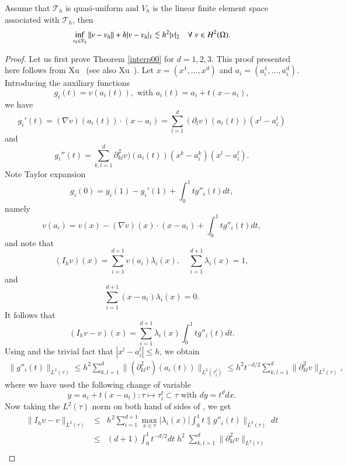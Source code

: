 \begin{theorem}\label{interp00}
Assume that $\mathcal T_h$ is quasi-uniform and $V_h$ is the linear finite element space associated with $\mathcal T_h$, then
\begin{equation}
\label{error0}
\inf_{v_h\in V_h} \|v-v_h\|+h |v-v_h|_{1}\lc h^2 |v|_2
        \qall v\in H^2(\Om).
\end{equation}
 \end{theorem}
 \begin{proof}  
Let us first prove Theorem \ref{interp00} for $d=1, 2, 3$.
This proof presented here follows from Xu~\cite{xu1982estimate} (see also Xu~\cite{xu2013estimate}).
Let $x=(x^1,\ldots, x^d)$ and $a_i=(a^1_{i}, \ldots, a^d_{i})$. Introducing
the auxiliary functions
$$
g_i(t)=v(a_i(t)),\mbox{  with  }  a_i(t)=a_i+t(x-a_i),
$$
we have
$$
g_i'(t)=(\nabla v)(a_i(t))\cdot (x-a_i)
=\sum_{l=1}^d(\partial_lv)(a_i(t))(x^l-a_i^l)
$$
and
\begin{equation}\label{gpp}
g_i''(t)=\sum_{k,l=1}^d\partial^2_{kl}v)(a_i(t))(x^k-a_i^k)(x^l-a_i^l).
\end{equation}
Note Taylor expansion
$$
        g_i(0)=g_i(1)-g_i'(1)+\int_0^1tg''_i(t)dt,
$$
namely
\begin{equation}\label{Taylor_vi}
v(a_i)=v(x)-(\nabla v)(x)\cdot (x-a_i)+\int_0^1tg''_i(t)dt,
\end{equation}
and note that
$$
(I_hv)(x)=\sum_{i=1}^{d+1}v(a_i)\lambda_i(x), \quad \sum_{i=1}^{d+1}\lambda_i(x)=1,
$$
and
$$
\sum_{i=1}^{d+1}(x-a_i)\lambda_i(x)=0.
$$
It follows that
\begin{equation}\label{Ihvv}
(I_hv-v)(x)=\sum_{i=1}^{d+1}\lambda_i(x)\int_0^1tg''_i(t)dt.
\end{equation}
Using  and the trivial fact that $|x^l-a_i^l|\le h$,
we obtain
\begin{eqnarray*}
\|g''_i(t)\|_{L^2(\tau)}\le h^2
\sum_{k,l=1}^d\|(\partial^2_{kl}v)(a_i(t))\|_{L^2(\tau_i^t)}
\le h^2t^{-d/2}\sum_{k,l=1}^d\|\partial^2_{kl}v\|_{L^2(\tau)},
\end{eqnarray*}
where we have used the following change of variable
$$
y=a_i+t(x-a_i): \tau\mapsto \tau_i^t\subset\tau \mbox{ with } dy=t^ddx.
$$
Now taking the $L^2(\tau)$ norm on both hand of sides of
, we get
\begin{eqnarray*}
\|I_hv-v\|_{L^2(\tau)}
&\le& h^2\sum_{i=1}^{d+1}\max_{x\in\tau}|\lambda_i(x)|
\int_0^1t\|g''_i(t)\|_{L^2(\tau)}\;dt\\
&\le& (d+1)\int_0^1t^{-d/2}dt\;h^2\;
\sum_{k,l=1}^d\|\partial^2_{kl}v\|_{L^2(\tau)}\\

\end{eqnarray*}
\end{proof}
